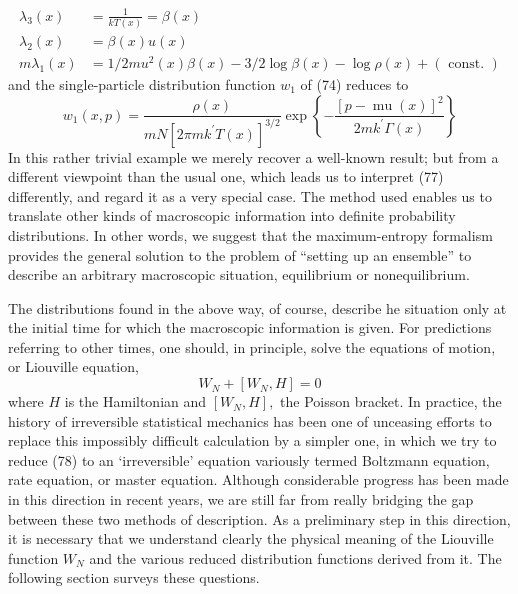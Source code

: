 \documentclass[]{article}
\begin{document}
\begin{equation}
\begin{aligned}
\lambda_{3}(x) &=\frac{1}{k T(x)}=\beta(x) \\
\lambda_{2}(x) &=\beta(x) u(x) \\
m \lambda_{1}(x) &=1 / 2 m u^{2}(x) \beta(x)-3 / 2 \log \beta(x)-\log \rho(x)+(\text { const. })
\end{aligned}
\end{equation}
and the single-particle distribution function $w_{1}$ of (74) reduces to
\begin{equation}
w_{1}(x, p)=\frac{\rho(x)}{m N\left[2 \pi m k^{\prime} T(x)\right]^{3 / 2}} \exp \left\{-\frac{[p-\operatorname{mu}(x)]^{2}}{2 m k^{\prime} \Gamma(x)}\right\}
\end{equation}
In this rather trivial example we merely recover a well-known result; but from a different viewpoint than the usual one, which leads us to interpret (77) differently, and regard it as a very special case. The method used enables us to translate other kinds of macroscopic information into definite probability distributions. In other words, we suggest that the maximum-entropy formalism provides the general solution to the problem of ``setting up an ensemble'' to describe an arbitrary macroscopic situation, equilibrium or nonequilibrium.

The distributions found in the above way, of course, describe he situation only at the initial time for which the macroscopic information is given. For predictions referring to other times, one should, in principle, solve the equations of motion, or Liouville equation,
\begin{equation}
W _{ N }+\left[ W _{ N }, H \right]=0
\end{equation}
where $H$ is the Hamiltonian and $\left[ W _{ N }, H \right],$ the Poisson bracket. In practice, the history of irreversible statistical mechanics has been one of unceasing efforts to replace this impossibly difficult calculation by a simpler one, in which we try to reduce (78) to an `irreversible' equation variously termed Boltzmann equation, rate equation, or master equation. Although considerable progress has been made in this direction in recent years, we are still far from really bridging the gap between these two methods of description. As a preliminary step in this direction, it is necessary that we understand clearly the physical meaning of the Liouville function $W_{N}$ and the various reduced distribution functions derived from it. The following section surveys these questions.



\end{document}
